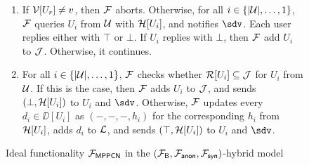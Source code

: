 \begin{figure*}[!t]
{{\begin{enumerate}
	
	
	\item If $\mathcal{V}[U_r] \neq v$, then $\mathcal{F}$ aborts. Otherwise, for all $i \in \{|\mathcal{U}|,\ldots,1\}$, 
	$\mathcal{F}$ queries $U_i$ from $\mathcal{U}$ with $\mathcal{H}[U_i]$, and notifies $\sdv$. Each user replies either 
	with $\top$ or $\bot$. If $U_i$ replies with $\bot$, then $\mathcal{F}$ add $U_i$ to $\mathcal{J}$. 
	Otherwise, it continues.
	
	
	\item For all $i \in \{|\mathcal{U}|,\ldots,1\}$, $\mathcal{F}$ checks whether $\mathcal{R}[U_i] \subseteq \mathcal{J}$ for 
	$U_i$ from $\mathcal{U}$. If this is the case, then $\mathcal{F}$ adds $U_i$ to $\mathcal{J}$, and sends $(\bot, 
	\mathcal{H}[U_i])$ to $U_i$ and $\sdv$. Otherwise, $\mathcal{F}$ updates every $d_i \in \DD[U_i]$ as 
	$(-, -, -, h_i)$ for the corresponding $h_i$ from $\mathcal{H}[U_i]$, adds $d_i$ to $\mathcal{L}$, and 
	sends $(\top, \mathcal{H}[U_i])$ to $U_i$ and $\sdv$.
\end{enumerate}
}}



\caption{Ideal functionality $\mathcal{F}_{\mathsf{MPPCN}}$ in the $(\mathcal{F}_{\mathsf{B}}, \mathcal{F}_{\mathsf{anon}}, 
\mathcal{F}_{\mathsf{syn}})$-hybrid model}
\label{fig:ideal-mppcn}
\end{figure*}

